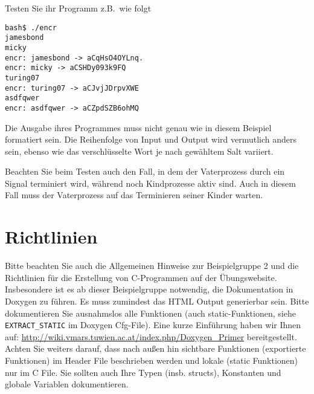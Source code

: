 \documentclass{article}
\begin{document}
Testen Sie ihr Programm z.B.\ wie folgt
\begin{verbatim}
bash$ ./encr
jamesbond
micky
encr: jamesbond -> aCqHsO4OYLnq.
encr: micky -> aCSHDy093k9FQ
turing07
encr: turing07 -> aCJvjJDrpvXWE
asdfqwer
encr: asdfqwer -> aCZpdSZB6ohMQ
\end{verbatim}

Die Ausgabe ihres Programmes muss nicht genau wie in diesem Beispiel
formatiert sein. Die Reihenfolge von Input und Output wird vermutlich
anders sein, ebenso wie das verschlüsselte Wort je nach gewähltem Salt
variiert.

Beachten Sie beim Testen auch den Fall, in dem der Vaterprozess durch
ein Signal terminiert wird, während noch Kindprozesse aktiv sind. Auch
in diesem Fall muss der Vaterprozess auf das Terminieren seiner Kinder
warten.

\section*{Richtlinien}
Bitte beachten Sie auch die Allgemeinen Hinweise zur Beispielgruppe 2 und die Richtlinien f\"ur die Erstellung von C-Programmen auf der \"Ubungswebsite.
Insbesondere ist es ab dieser Beispielgruppe notwendig, die Dokumentation in Doxygen zu f\"uhren. Es muss zumindest das HTML Output generierbar sein. Bitte dokumentieren Sie ausnahmslos alle Funktionen (auch static-Funktionen, siehe \verb|EXTRACT_STATIC| im Doxygen Cfg-File). Eine kurze Einf\"uhrung haben wir Ihnen auf: \url{http://wiki.vmars.tuwien.ac.at/index.php/Doxygen_Primer} bereitgestellt. Achten Sie weiters darauf, dass nach au{\ss}en hin sichtbare Funktionen (exportierte Funktionen) im Header File beschrieben werden und lokale (static Funktionen) nur im C File. Sie sollten auch Ihre Typen (insb. structs), Konstanten und globale Variablen dokumentieren. 
\end{document}
